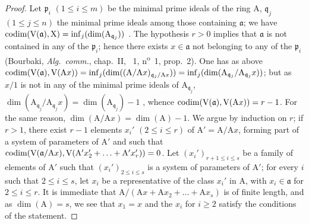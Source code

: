 \begin{proof}
Let $\mathfrak{p}_i$ $(1\leq i\leq m)$ be the minimal prime ideals of the ring $\mathrm{A}$, $\mathfrak{q}_j$ $(1\leq j\leq n)$ the minimal prime ideals among those containing $\mathfrak{a}$; we have  $\operatorname{codim}(\mathrm{V}(\mathfrak{a}),\mathrm{X})=\inf_j(\dim(\mathrm{A}_{\mathfrak{q}_j}))$ .
The hypothesis $r>0$ implies that $\mathfrak{a}$ is not contained in any of the $\mathfrak{p}_i$; hence there exists $x\in\mathfrak{a}$ not belonging to any of the $\mathfrak{p}_i$ (Bourbaki, \emph{Alg.~comm.}, chap.~II, \textsection~1, n\textsuperscript{o}~1, prop.~2).
One has as above $\operatorname{codim}(\mathrm{V}(\mathfrak{a}),\mathrm{V}(\mathrm{A}x))=\inf_j(\dim((\mathrm{A}/\mathrm{A}x)_{\mathfrak{q}_j/\mathrm{A}x}))=\inf_j(\dim(\mathrm{A}_{\mathfrak{q}_j}/\mathrm{A}_{\mathfrak{q}_j}x))$; but as $x/1$ is not in any of the minimal prime ideals of $\mathrm{A}_{\mathfrak{q}_j}$, $\dim(\mathrm{A}_{\mathfrak{q}_j}/\mathrm{A}_{\mathfrak{q}_j}x)=\dim(\mathrm{A}_{\mathfrak{q}_j})-1$ , whence $\operatorname{codim}(\mathrm{V}(\mathfrak{a}),\mathrm{V}(\mathrm{A}x))=r-1$.
For the same reason, $\dim(\mathrm{A}/\mathrm{A}x)=\dim(\mathrm{A})-1$.
We argue by induction on $r$; if $r>1$, there exist $r-1$ elements $x_i'$ $(2\leq i\leq r)$ of $\mathrm{A}'=\mathrm{A}/\mathrm{A}x$, forming part of a system of parameters of $\mathrm{A}'$ and such that $\operatorname{codim}(\mathrm{V}(\mathfrak{a}/\mathrm{A}x),\mathrm{V}(\mathrm{A}'x_2'+\ldots+\mathrm{A}'x_r'))=0$.
Let $(x_i')_{r+1\leq i\leq s}$ be a family of elements of $\mathrm{A}'$ such that $(x_i')_{2\leq i\leq s}$ is a system of parameters of $\mathrm{A}'$; for every $i$ such that $2\leq i\leq s$, let $x_i$ be a representative of the class $x_i'$ in $\mathrm{A}$, with $x_i\in\mathfrak{a}$ for $2\leq i\leq r$. It is immediate that $\mathrm{A}/(\mathrm{A}x+\mathrm{A}x_2+\ldots+\mathrm{A}x_s)$ is of finite length, and as $\dim(\mathrm{A})=s$, we see that $x_1=x$ and the $x_i$ for $i\geq 2$ satisfy the conditions of the statement.
\end{proof}

